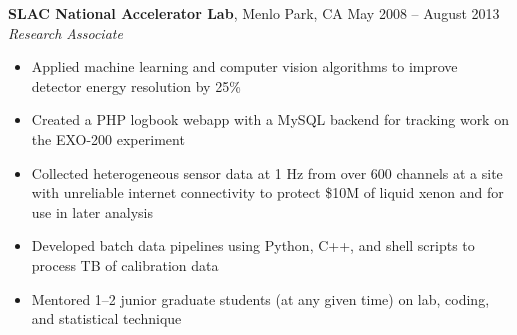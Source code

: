 \documentclass[margin,line]{resume}
\begin{document}
\begin{resume}
    \textbf{SLAC National Accelerator Lab}, Menlo Park, CA \hfill May 2008 -- August 2013\vspace{1mm}\\\vspace{1mm}%
    \textsl{Research Associate}
    \begin{itemize}
    \item Applied machine learning and computer vision algorithms to improve detector energy resolution by 25\%
    \item Created a PHP logbook webapp with a MySQL backend for tracking work on the EXO-200 experiment
    \item Collected heterogeneous sensor data at 1 Hz from over 600 channels at a site with unreliable internet connectivity to protect \$10M of liquid xenon and for use in later analysis
    \item Developed batch data pipelines using Python, C++, and shell scripts to process TB of calibration data
    \item Mentored 1--2 junior graduate students (at any given time) on lab, coding, and statistical technique
    \end{itemize}
    
    

\end{resume}
\end{document}
